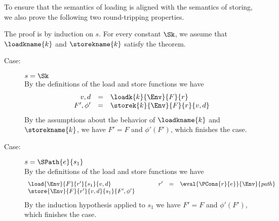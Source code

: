 To ensure that the semantics of loading is aligned with the semantics
of storing, we also prove the following two round-tripping properties.
%
%
{ The proof is by induction on $s$. For every constant $\Sk$, we
  assume that $\loadkname{k}$ and $\storekname{k}$ satisfy the theorem. 
\begin{description}
\item[Case:] $s = \Sk$\\[1ex]
%
By the definitions of the load and store functions we have 
\[ 
\begin{array}{rcl}
v,d  &=& \loadk{k}{\Env}{F}{r}\\
F',\phi' &=& \storek{k}{\Env}{F}{r}{v,d}\\
\end{array}
\]
By the assumptions about the behavior of $\loadkname{k}$ and
$\storekname{k}$, we have $F' = F$ and $\phi'(F')$, which finishes the
case.

\item[Case:] $s=\SPath{e}{s_1}$\\[1ex]
%
By the definitions of the load and store functions we have 
%
\[ 
\begin{array}{l}
\load{\Env}{F}{r'}{s_1}{v,d}\\
\store{\Env}{F}{r'}{v,d}{s_1}{F',\phi'}
\end{array} \hspace*{1cm}
\begin{array}{rcl}
r' & = & \eval{\PCons{r}{e}}{\Env}{\mathit{path}}\\
\\
\end{array}
\]
%
By the induction hypothesis applied to $s_1$ we have $F' = F$ and
$\phi'(F')$, which finishes the case.


\end{description}}
